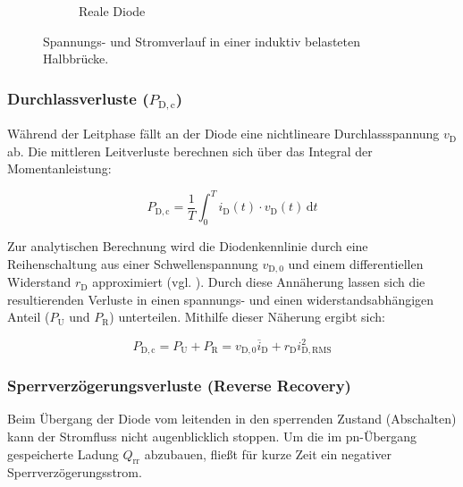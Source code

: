\begin{figure}[htbp]
\begin{subfigure}[b]{0.48\textwidth}
        \caption{Reale Diode}
        \label{fig:diode_real}
    \end{subfigure}
    
    \caption{Spannungs- und Stromverlauf in einer induktiv belasteten Halbbrücke.}
    \label{fig:id_diode}
\end{figure}
\subsubsection{Durchlassverluste ($P_{\mathrm{D,c}}$)}
Während der Leitphase fällt an der Diode eine nichtlineare Durchlassspannung $v_\mathrm{D}$ ab. Die mittleren Leitverluste berechnen sich über das Integral der Momentanleistung:

\begin{equation}
    P_{\mathrm{D,c}} = \frac{1}{T} \int_{0}^{T} i_\mathrm{D}(t) \cdot v_\mathrm{D}(t) \, \mathrm{d}t
    \label{eq:p_d_con}
\end{equation}

Zur analytischen Berechnung wird die Diodenkennlinie durch eine Reihenschaltung aus einer Schwellenspannung $v_{\mathrm{D,0}}$ und einem differentiellen Widerstand $r_\mathrm{D}$ approximiert (vgl. \cite[Abb.~2]{Infineon_MOSFET_Losses}). Durch diese Annäherung lassen sich die resultierenden Verluste in einen spannungs- und einen widerstandsabhängigen Anteil ($P_\mathrm{U}$ und $P_\mathrm{R}$) unterteilen. Mithilfe dieser Näherung ergibt sich:

\begin{equation}
    P_{\mathrm{D,c}} = P_\mathrm{U} + P_\mathrm{R} = v_{\mathrm{D,0}} \overline{i}_{\mathrm{D}} + r_\mathrm{D}i_{\mathrm{D,RMS}}^2
    \label{eq:p_d_con_vereinfacht}
\end{equation}

\subsubsection{Sperrverzögerungsverluste (Reverse Recovery)}
Beim Übergang der Diode vom leitenden in den sperrenden Zustand (Abschalten) kann der Stromfluss nicht augenblicklich stoppen. Um die im pn-Übergang gespeicherte Ladung $Q_{\mathrm{rr}}$ abzubauen, fließt für kurze Zeit ein negativer Sperrverzögerungsstrom. 

